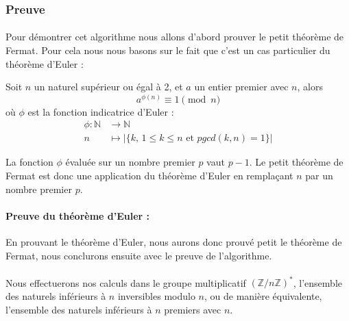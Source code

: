 	
	\subsubsection{Preuve}
		\paragraph{}Pour démontrer cet algorithme nous allons d'abord prouver le petit théorème de Fermat. Pour cela nous nous basons sur le fait que c'est un cas particulier du théorème d'Euler :
		
		\vspace{-1.5em}\begin{adjustwidth}{1.5cm}{1.5cm} 
		\begin{Th}
			\label{ThEuler}
			Soit $n$ un naturel supérieur ou égal à 2, et $a$ un entier premier avec $n$, alors
			\[a^{\phi(n)}\equiv 1 \pmod n\]
			où $\phi$ est la fonction indicatrice d'Euler :
			\begin{align*}
				\phi \colon \mathbb{N} &\to \mathbb{N}\\
				n &\mapsto | \{k \text{, } 1 \leq k \leq n \text{ et } pgcd(k,n) = 1\} |
			\end{align*}
		\end{Th}
		\end{adjustwidth}\vspace{0.5em}
		
		La fonction $\phi$ évaluée sur un nombre premier $p$ vaut $p - 1$. Le petit théorème de Fermat est donc une application du théorème d'Euler en remplaçant $n$ par un nombre premier $p$.
		
		\paragraph{Preuve du théorème d'Euler :\\}
			En prouvant le théorème d'Euler, nous aurons donc prouvé petit le théorème de Fermat, nous conclurons ensuite avec le preuve de l'algorithme.
			\paragraph{}Nous effectuerons nos calculs dans le groupe multiplicatif $(\mathbb{Z}/n\mathbb{Z})^*$, l'ensemble des naturels inférieurs à $n$ inversibles modulo $n$, ou de manière équivalente, l'ensemble des naturels inférieurs à $n$ premiers avec $n$.
			
